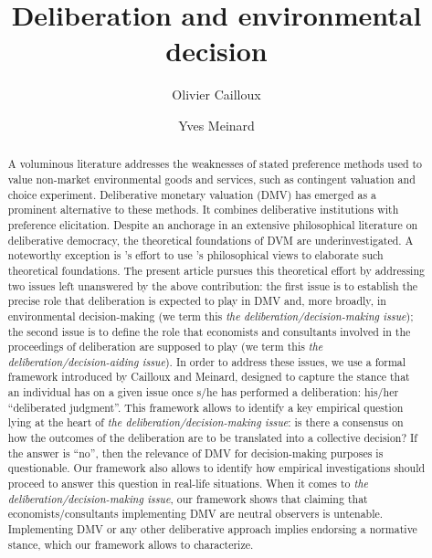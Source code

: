 \documentclass[version=3.21, pagesize, twoside=off, bibliography=totoc, DIV=calc, fontsize=12pt, a4paper, french, english]{scrartcl}
\newcommand{\institute}[1]{}
\newcommand{\keywords}[1]{}
\begin{document}
\title{Deliberation and environmental decision}
\author{Olivier Cailloux \and Yves Meinard}
\institute{
	Olivier Cailloux 
	\and
	Yves Meinard 
	\at 
	Université Paris-Dauphine, \\
	PSL Research University, \\
	CNRS, \\
	LAMSADE\\
	75016 PARIS, FRANCE\\
	\email{olivier.cailloux@dauphine.fr}
}
\makeatletter
\makeatother
\maketitle

\keywords{decision aid, justification, empirical validation, methodology}

\begin{abstract}
A voluminous literature addresses the weaknesses of stated preference methods used to value non-market environmental goods and services, such as contingent valuation and choice experiment. Deliberative monetary valuation (DMV) has emerged as a prominent alternative to these methods. It combines deliberative institutions with preference elicitation. Despite an anchorage in an extensive philosophical literature on deliberative democracy, the theoretical foundations of DVM are underinvestigated.  A noteworthy exception is \citeauthor{bartkowski_beyond_2018}'s effort to use \citeauthor{sen_idea_2009}'s philosophical views to elaborate such theoretical foundations. The present article pursues this theoretical effort by addressing two issues left unanswered by the above contribution: the first issue is to establish the precise role that deliberation is expected to play in DMV and, more broadly, in environmental decision-making (we term this \emph{the deliberation/decision-making issue}); the second issue is to define the role that economists and consultants involved in the proceedings of deliberation are supposed to play (we term this \emph{the deliberation/decision-aiding issue}). In order to address these issues, we use a formal framework introduced by Cailloux and Meinard, designed to capture the stance that an individual has on a given issue once s/he has performed a deliberation: his/her ``deliberated judgment''. This framework allows to identify a key empirical question lying at the heart of \emph{the deliberation/decision-making issue}: is there a consensus on how the outcomes of the deliberation are to be translated into a collective decision? If the answer is ``no'', then the relevance of DMV for decision-making purposes is questionable. Our framework also allows to identify how empirical investigations should proceed to answer this question in real-life situations. When it comes to \emph{the deliberation/decision-making issue}, our framework shows that claiming that economists/consultants implementing DMV are neutral observers is untenable. Implementing DMV or any other deliberative approach implies endorsing a normative stance, which our framework allows to characterize.
\end{abstract}
\end{document}
